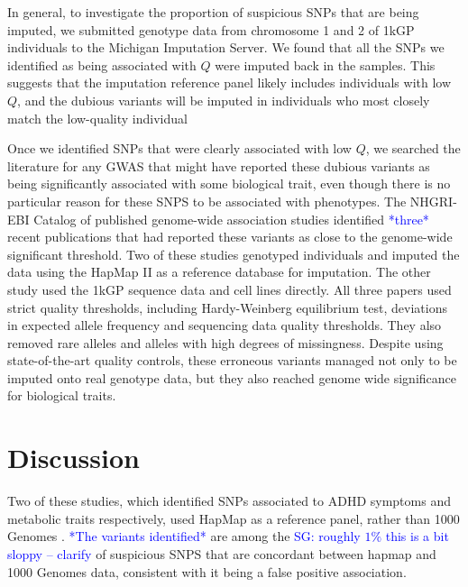 \documentclass[9pt,lineno]{elife}
\newcommand{\sgcomment}[1]{\textcolor{blue}{SG: #1}}
\newcommand{\todo}[1]{\textcolor{blue}{*#1*}}
\begin{document}
In general, to investigate the proportion of suspicious SNPs that are being imputed, we submitted genotype data from chromosome 1 and 2 of 1kGP individuals to the Michigan Imputation Server.
We found that all the SNPs we identified as being associated with $Q$ were imputed back in the samples. 
This suggests that the imputation reference panel likely includes individuals with low $Q$, and the dubious variants will be imputed in individuals who most closely match the low-quality individual

Once we identified SNPs that were clearly associated with low $Q$, we searched the literature for any GWAS that might have reported these dubious variants as being significantly associated with some biological trait, even though there is no particular reason for these SNPS to be associated with phenotypes.
The NHGRI-EBI Catalog of published genome-wide association studies identified \todo{three} recent publications that had reported these variants as close to the genome-wide significant threshold.
Two of these studies genotyped individuals and imputed the data using the HapMap II as a reference  database for imputation.
The other study used the 1kGP sequence data and cell lines directly.
All three papers used strict quality thresholds, including Hardy-Weinberg equilibrium test, deviations in expected allele frequency and sequencing data quality thresholds.
They also removed rare alleles and alleles with high degrees of missingness.
Despite using state-of-the-art quality controls, these erroneous variants managed not only to be imputed onto real genotype data, but they also reached genome wide significance for biological traits.

\section{Discussion}
Two of these studies, which identified SNPs associated to ADHD symptoms and metabolic traits respectively, used HapMap as a reference panel, rather than 1000 Genomes \citep{Ebejer2013}. \todo{The variants identified} are among the \sgcomment{roughly $1\%$ this is a bit sloppy -- clarify} of suspicious SNPS that are concordant between hapmap and 1000 Genomes data, consistent with it being a false positive association.
\end{document}
